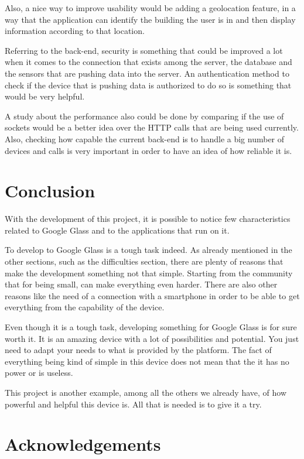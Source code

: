 \documentclass[a4paper,11pt]{article}
\begin{document}
Also, a nice way to improve usability would be adding a geolocation feature, in a way that the application can identify the building the user is in and then display information according to that location.

Referring to the back-end, security is something that could be improved a lot when it comes to the connection that exists among the server, the database and the sensors that are pushing data into the server. An authentication method to check if the device that is pushing data is authorized to do so is something that would be very helpful.

A study about the performance also could be done by comparing if the use of sockets would be a better idea over the HTTP calls that are being used currently. Also, checking how capable the current back-end is to handle a big number of devices and calls is very important in order to have an idea of how reliable it is.

\section{Conclusion}

With the development of this project, it is possible to notice few characteristics related to Google Glass and to the applications that run on it.

To develop to Google Glass is a tough task indeed. As already mentioned in the other sections, such as the difficulties section, there are plenty of reasons that make the development something not that simple. Starting from the community that for being small, can make everything even harder. There are also other reasons like the need of a connection with a smartphone in order to be able to get everything from the capability of the device. 

Even though it is a tough task, developing something for Google Glass is for sure worth it. It is an amazing device with a lot of possibilities and potential. You just need to adapt your needs to what is provided by the platform. The fact of everything being kind of simple in this device does not mean that the it has no power or is useless.

This project is another example, among all the others we already have, of how powerful and helpful this device is. All that is needed is to give it a try.

\section{Acknowledgements}
\end{document}
